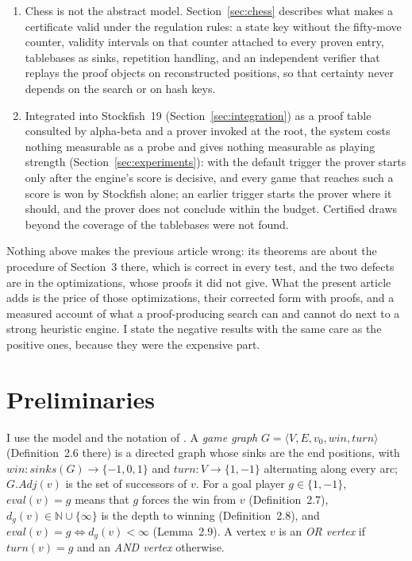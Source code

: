 \documentclass{article}
\theoremstyle{plain}
\theoremstyle{definition}
\theoremstyle{remark}
\newcommand{\Adj}{\mathit{Adj}}
\newcommand{\eval}{\mathit{eval}}
\newcommand{\turn}{\mathit{turn}}
\newcommand{\win}{\mathit{win}}
\newcommand{\sinks}{\mathit{sinks}}
\begin{document}
\begin{enumerate}[leftmargin=*]
\item Chess is not the abstract model. Section~\ref{sec:chess} describes what makes a certificate valid under the regulation rules: a state key without the fifty-move counter, validity intervals on that counter attached to every proven entry, tablebases as sinks, repetition handling, and an independent verifier that replays the proof objects on reconstructed positions, so that certainty never depends on the search or on hash keys.
\item Integrated into Stockfish~19 (Section~\ref{sec:integration}) as a proof table consulted by alpha-beta and a prover invoked at the root, the system costs nothing measurable as a probe and gives nothing measurable as playing strength (Section~\ref{sec:experiments}): with the default trigger the prover starts only after the engine's score is decisive, and every game that reaches such a score is won by Stockfish alone; an earlier trigger starts the prover where it should, and the prover does not conclude within the budget. Certified draws beyond the coverage of the tablebases were not found.
\end{enumerate}

Nothing above makes the previous article wrong: its theorems are about the procedure of Section~3 there, which is correct in every test, and the two defects are in the optimizations, whose proofs it did not give. What the present article adds is the price of those optimizations, their corrected form with proofs, and a measured account of what a proof-producing search can and cannot do next to a strong heuristic engine. I state the negative results with the same care as the positive ones, because they were the expensive part.

\section{Preliminaries}\label{sec:prelim}

I use the model and the notation of \cite{romano2026}. A \emph{game graph} $G = \langle V, E, v_0, \win, \turn\rangle$ (Definition~2.6 there) is a directed graph whose sinks are the end positions, with $\win : \sinks(G) \to \{-1, 0, 1\}$ and $\turn : V \to \{1, -1\}$ alternating along every arc; $G.\Adj(v)$ is the set of successors of $v$. For a goal player $g \in \{1, -1\}$, $\eval(v) = g$ means that $g$ forces the win from $v$ (Definition~2.7), $d_g(v) \in \mathbb{N} \cup \{\infty\}$ is the depth to winning (Definition~2.8), and $\eval(v) = g \iff d_g(v) < \infty$ (Lemma~2.9). A vertex $v$ is an \emph{OR vertex} if $\turn(v) = g$ and an \emph{AND vertex} otherwise.
\end{document}
